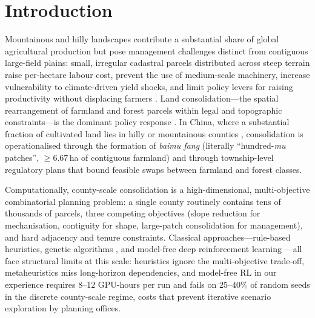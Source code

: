 \documentclass[11pt]{article}
\begin{document}
\section{Introduction}\label{sec:intro}

Mountainous and hilly landscapes contribute a substantial share of global agricultural production but pose management challenges distinct from contiguous large-field plains: small, irregular cadastral parcels distributed across steep terrain raise per-hectare labour cost, prevent the use of medium-scale machinery, increase vulnerability to climate-driven yield shocks, and limit policy levers for raising productivity without displacing farmers \citep{romeo2020fao,liu2023fragmentation,niu2023fragmentation,foley2011solutions,springmann2018options}. Land consolidation---the spatial rearrangement of farmland and forest parcels within legal and topographic constraints---is the dominant policy response \citep{liu2014land,long2014rural,rounsevell2014challenges}. In China, where a substantial fraction of cultivated land lies in hilly or mountainous counties \citep{huang2018evaluation}, consolidation is operationalised through the formation of \textit{baimu fang} (literally ``hundred-\textit{mu} patches'', $\geq 6.67$\,ha of contiguous farmland) and through township-level regulatory plans that bound feasible swaps between farmland and forest classes.

Computationally, county-scale consolidation is a high-dimensional, multi-objective combinatorial planning problem: a single county routinely contains tens of thousands of parcels, three competing objectives (slope reduction for mechanisation, contiguity for shape, large-patch consolidation for management), and hard adjacency and tenure constraints. Classical approaches---rule-based heuristics, genetic algorithms \citep{cao2012boundary,deb2002fast,stewart2004multi,aerts2002using}, and model-free deep reinforcement learning \citep{zheng2023urban,equihua2024connectivity,janowicz2020geoai}---all face structural limits at this scale: heuristics ignore the multi-objective trade-off, metaheuristics miss long-horizon dependencies, and model-free RL in our experience requires $8$--$12$ GPU-hours per run and fails on $25$--$40\%$ of random seeds in the discrete county-scale regime, costs that prevent iterative scenario exploration by planning offices.
\end{document}
